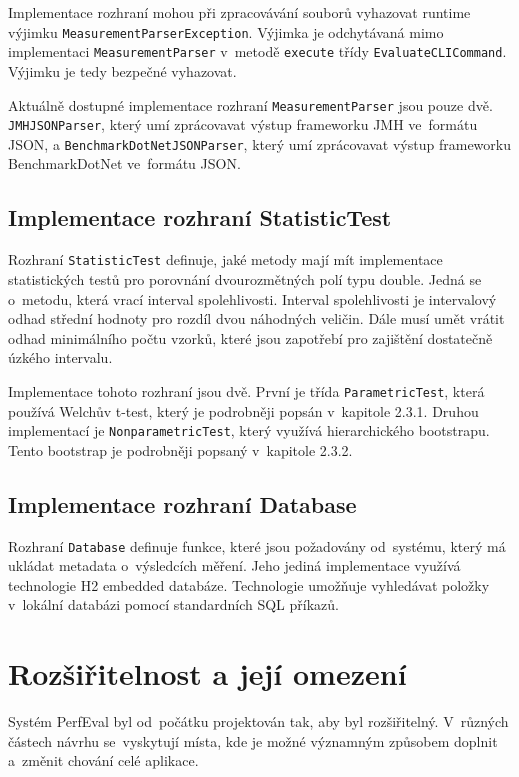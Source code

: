 Implementace rozhraní mohou při zpracovávání souborů vyhazovat runtime výjimku
\lstinline{MeasurementParserException}. Výjimka je odchytávaná mimo implementaci \lstinline{MeasurementParser}
v~metodě \lstinline{execute} třídy \lstinline{EvaluateCLICommand}. Výjimku je tedy bezpečné vyhazovat.

Aktuálně dostupné implementace rozhraní \lstinline{MeasurementParser} jsou pouze dvě.
\lstinline{JMHJSONParser}, který umí zprácovavat výstup frameworku JMH ve~formátu JSON, a \lstinline{BenchmarkDotNetJSONParser}, který
umí zprácovavat výstup frameworku BenchmarkDotNet ve~formátu JSON.

\subsection{Implementace rozhraní StatisticTest}

Rozhraní \lstinline{StatisticTest} definuje, jaké metody mají mít implementace statistických testů
pro porovnání dvourozmětných polí typu double. Jedná se o~metodu, která vrací interval spolehlivosti.
Interval spolehlivosti je intervalový odhad střední hodnoty pro rozdíl dvou náhodných veličin.
Dále musí umět vrátit odhad minimálního počtu vzorků, které jsou zapotřebí pro zajištění dostatečně úzkého intervalu.

Implementace tohoto rozhraní jsou dvě. První je třída \lstinline{ParametricTest}, která používá
Welchův t-test, který je podrobněji popsán v~kapitole 2.3.1. Druhou implementací je
\lstinline{NonparametricTest}, který využívá hierarchického bootstrapu. Tento bootstrap je podrobněji
popsaný v~kapitole 2.3.2.

\subsection{Implementace rozhraní Database}

Rozhraní \lstinline{Database} definuje funkce, které jsou požadovány od~systému, který má ukládat
metadata o~výsledcích měření. Jeho jediná implementace využívá technologie H2 embedded databáze.
Technologie umožňuje vyhledávat položky v~lokální databázi pomocí standardních SQL příkazů.

\section{Rozšiřitelnost a její omezení}

Systém PerfEval byl od~počátku projektován tak, aby byl rozšiřitelný.
V~různých částech návrhu se~vyskytují místa,
kde je možné významným způsobem doplnit a~změnit chování celé aplikace.


